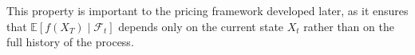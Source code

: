 This property is important to the pricing framework 
developed later, as it ensures that $\mathbb{E}[f(X_T) \mid \mathcal{F}_t]$ 
depends only on the current state $X_t$ rather than on the full history of 
the process.



